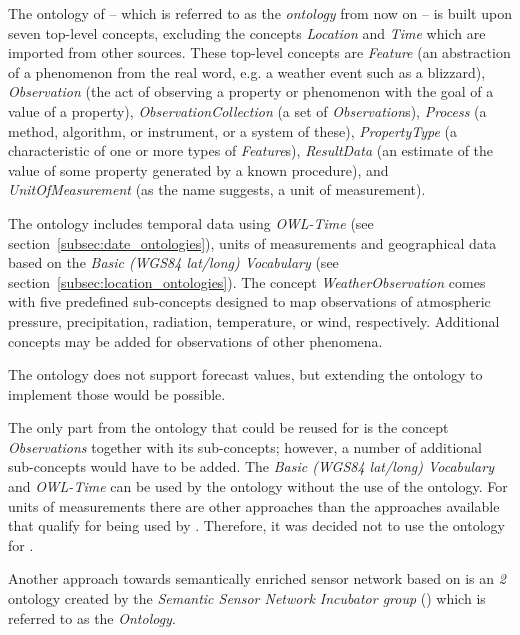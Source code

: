 The ontology of  -- which is referred to as the \emph{ ontology} from now on -- is built upon seven top-level concepts, excluding the concepts \emph{Location} and \emph{Time} which are imported from other sources. These top-level concepts are \emph{Feature} (an abstraction of a phenomenon from the real word, e.g. a weather event such as a blizzard), \emph{Observation} (the act of observing a property or phenomenon with the goal of a value of a property), \emph{ObservationCollection} (a set of \emph{Observation}s), \emph{Process} (a method, algorithm, or instrument, or a system of these), \emph{PropertyType} (a characteristic of one or more types of \emph{Feature}s), \emph{ResultData} (an estimate of the value of some property generated by a known procedure), and \emph{UnitOfMeasurement} (as the name suggests, a unit of measurement).

The  ontology includes temporal data using \emph{OWL-Time} (see section~\ref{subsec:date_ontologies}), units of measurements and geographical data based on the \emph{Basic (WGS84 lat/long) Vocabulary} (see section~\ref{subsec:location_ontologies}). The concept \emph{WeatherObservation} comes with five predefined sub-concepts designed to map observations of atmospheric pressure, precipitation, radiation, temperature, or wind, respectively. Additional concepts may be added for observations of other phenomena.

The  ontology does not support forecast values, but extending the  ontology to implement those would be possible.

The only part from the  ontology that could be reused for \smarthomeweather is the concept \emph{Observations} together with its sub-concepts; however, a number of additional sub-concepts would have to be added. The \emph{Basic (WGS84 lat/long) Vocabulary} and \emph{OWL-Time} can be used by the \smarthomeweather ontology without the use of the  ontology. For units of measurements there are other approaches than the  approaches available that qualify for being used by \smarthomeweather. Therefore, it was decided not to use the  ontology for \smarthomeweather.

\vspace{1em}


Another approach towards semantically enriched sensor network based on  is an \emph{ 2} ontology created by the \emph{ Semantic Sensor Network Incubator group} () which is referred to as the \emph{ Ontology}. 

